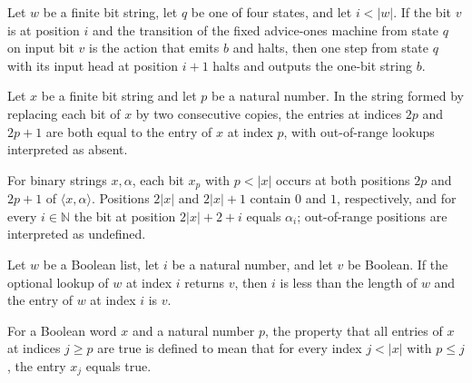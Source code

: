 \begin{lemma}
\label{Complexity.ao_halt}
\leanok
{}
Let $w$ be a finite bit string, let $q$ be one of four states, and let $i<|w|$. If the
bit $v$ is at position $i$ and the transition of the fixed advice-ones machine from
state $q$ on input bit $v$ is the action that emits $b$ and halts, then one step from
state $q$ with its input head at position $i+1$ halts and outputs the one-bit string
$b$.
\end{lemma}

\begin{lemma}
\leanok
{}
Let $x$ be a finite bit string and let $p$ be a natural number. In the string formed by
replacing each bit of $x$ by two consecutive copies, the entries at indices $2p$ and
$2p+1$ are both equal to the entry of $x$ at index $p$, with out-of-range lookups
interpreted as absent.
\end{lemma}

\begin{lemma}
\leanok
{}
For binary strings $x,\alpha$, each bit $x_p$ with $p<|x|$ occurs at both positions $2p$
and $2p+1$ of $\langle x,\alpha\rangle$. Positions $2|x|$ and $2|x|+1$ contain $0$ and
$1$, respectively, and for every $i\in\mathbb{N}$ the bit at position $2|x|+2+i$ equals
$\alpha_i$; out-of-range positions are interpreted as undefined.
\end{lemma}

\begin{lemma}
\leanok
{}
Let $w$ be a Boolean list, let $i$ be a natural number, and let $v$ be Boolean. If the
optional lookup of $w$ at index $i$ returns $v$, then $i$ is less than the length of $w$
and the entry of $w$ at index $i$ is $v$.
\end{lemma}

\begin{definition}
\label{Complexity.onesFrom}
\leanok
For a Boolean word $x$ and a natural number $p$, the property that all entries of $x$ at
indices $j \ge p$ are true is defined to mean that for every index $j<|x|$ with $p\le
j$, the entry $x_j$ equals true.
\end{definition}

